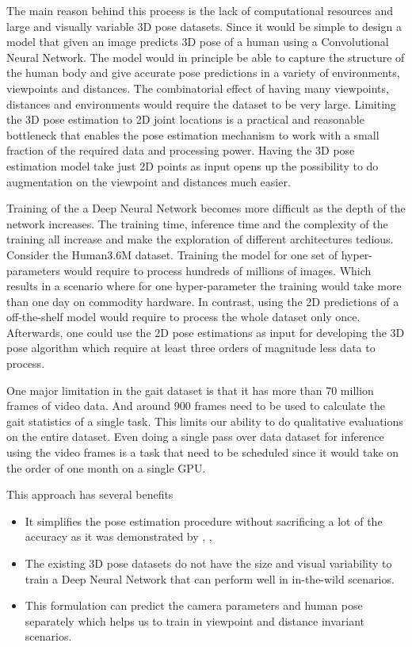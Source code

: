The main reason behind this process is the lack of computational resources and large and visually variable 3D pose datasets. Since it would be simple to design a model that given an image predicts 3D pose of a human using a Convolutional Neural Network. The model would in principle be able to capture the structure of the human body and give accurate pose predictions in a variety of environments, viewpoints and distances. The combinatorial effect of having many viewpoints, distances and environments would require the dataset to be very large. Limiting the 3D pose estimation to 2D joint locations is a practical and reasonable bottleneck that enables the pose estimation mechanism to work with a small fraction of the required data and processing power. Having the 3D pose estimation model take just 2D points as input opens up the possibility to do augmentation on the viewpoint and distances much easier. 

Training of the a Deep Neural Network becomes more difficult as the depth of the network increases. The training time, inference time and the complexity of the training all increase and make the exploration of different architectures tedious. 
Consider the Human3.6M dataset. Training the model for one set of hyper-parameters would require to process hundreds of millions of images. Which results in a scenario where for one hyper-parameter the training would take more than one day on commodity hardware. In contrast, using the 2D predictions of a off-the-shelf model would require to process the whole dataset only once. Afterwards, one could use the 2D pose estimations as input for developing the 3D pose algorithm which require at least three orders of magnitude less data to process.

One major limitation in the gait dataset is that it has more than 70 million frames of video data. And around 900 frames need to be used to calculate the gait statistics of a single task. This limits our ability to do qualitative evaluations on the entire dataset. Even doing a single pass over data dataset for inference using the video frames is a task that need to be scheduled since it would take on the order of one month on a single GPU. 

This approach has several benefits
\begin{itemize}
    \item It simplifies the pose estimation procedure without sacrificing a lot of the accuracy as it was demonstrated by \parencite{martinez2017simple}, \parencite{sun2017compositional}, \parencite{hossain2017exploiting}
    \item The existing 3D pose datasets do not have the size and visual variability to train a Deep Neural Network that can perform well in in-the-wild scenarios.
    \item This formulation can predict the camera parameters and human pose separately which helps us to train in viewpoint and distance invariant scenarios.
\end{itemize}

